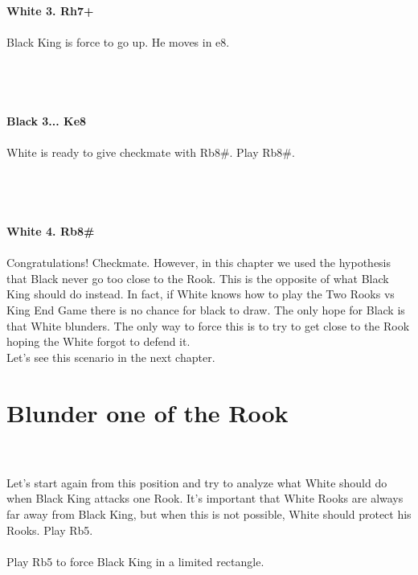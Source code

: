 \documentclass{article}
\begin{document}
\\

\\
\\
\textbf{White 3. Rh7+}\\
\\
Black King is force to go up. He moves in e8.\\\\
\\

\\
\\
\textbf{Black 3... Ke8}\\
\\
White is ready to give checkmate with Rb8\#. Play Rb8\#.\\\\
\\

\\
\\
\textbf{White 4. Rb8\#}\\
\\
Congratulations! Checkmate. However, in this chapter we used the hypothesis that Black never go too close to the Rook. This is the opposite of what Black King should do instead. In fact, if White knows how to play the Two Rooks vs King End Game there is no chance for black to draw. The only hope for Black is that White blunders. The only way to force this is to try to get close to the Rook hoping the White forgot to defend it.\\Let's see this scenario in the next chapter.\section{ Blunder one of the Rook}

\\
\\
Let's start again from this position and try to analyze what White should do when Black King attacks one Rook. It's important that White Rooks are always far away from Black King, but when this is not possible, White should protect his Rooks. Play Rb5.\\\\Play Rb5 to force Black King in a limited rectangle.\\

\end{document}
